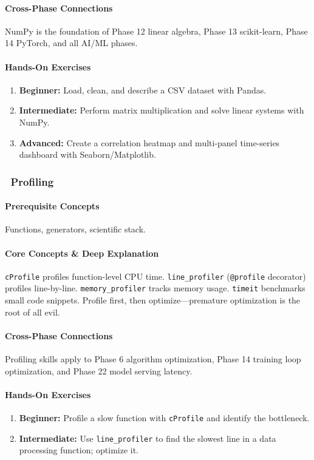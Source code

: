 \documentclass[11pt, a4paper, oneside]{report}
\newcommand{\awareness}[1]{\subsubsection{\texorpdfstring{\fcolorbox{gray!50}{gray!10}{\footnotesize\bfseries\color{gray!50!black} AWARENESS}~#1}{#1}}}
\begin{document}
\paragraph{Cross-Phase Connections} NumPy is the foundation of Phase 12 linear algebra, Phase 13 scikit-learn, Phase 14 PyTorch, and all AI/ML phases.

\paragraph{Hands-On Exercises}
\begin{enumerate}[leftmargin=*]
\item \textbf{Beginner:} Load, clean, and describe a CSV dataset with Pandas.
\item \textbf{Intermediate:} Perform matrix multiplication and solve linear systems with NumPy.
\item \textbf{Advanced:} Create a correlation heatmap and multi-panel time-series dashboard with Seaborn/Matplotlib.
\end{enumerate}

\awareness{Profiling}

\paragraph{Prerequisite Concepts} Functions, generators, scientific stack.

\paragraph{Core Concepts \& Deep Explanation} \texttt{cProfile} profiles function-level CPU time. \texttt{line\_profiler} (\texttt{@profile} decorator) profiles line-by-line. \texttt{memory\_profiler} tracks memory usage. \texttt{timeit} benchmarks small code snippets. Profile first, then optimize---premature optimization is the root of all evil.

\paragraph{Cross-Phase Connections} Profiling skills apply to Phase 6 algorithm optimization, Phase 14 training loop optimization, and Phase 22 model serving latency.

\paragraph{Hands-On Exercises}
\begin{enumerate}[leftmargin=*]
\item \textbf{Beginner:} Profile a slow function with \texttt{cProfile} and identify the bottleneck.
\item \textbf{Intermediate:} Use \texttt{line\_profiler} to find the slowest line in a data processing function; optimize it.
\end{enumerate}
\end{document}

